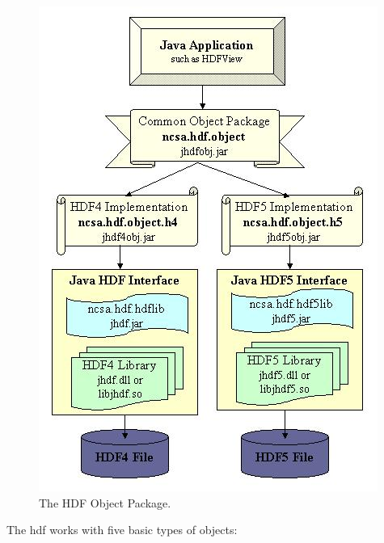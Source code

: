 \begin{figure}
	\includegraphics[scale=0.49]{obrazky/hdf-obj.jpg}
	\caption{The HDF Object Package. \cite{hdf_object}}
	\label{hdf-obj}
\end{figure}

The \gls{hdf} works with five basic types of objects:

